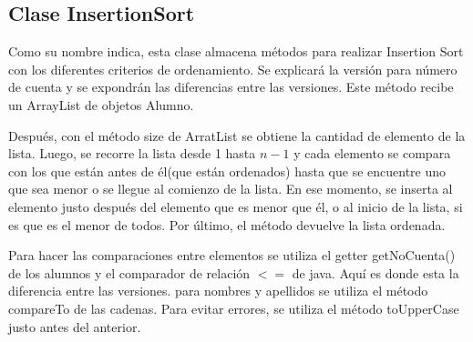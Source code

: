 \documentclass[11pt]{article}
\begin{document}
\subsection{Clase InsertionSort}
Como su nombre indica, esta clase almacena métodos para realizar Insertion Sort con los diferentes criterios de ordenamiento. Se explicará la versión para número de cuenta y se expondrán las diferencias entre las versiones. Este método recibe un ArrayList de objetos Alumno. 
\par
Después, con el método size de ArratList se obtiene la cantidad de elemento de la lista. Luego, se recorre la lista desde 1 hasta $n-1$ y cada elemento se compara con los que están antes de él(que están ordenados) hasta que se encuentre uno que sea menor o se llegue al comienzo de la lista. En ese momento, se inserta al elemento justo después del elemento que es menor que él, o al inicio de la lista, si es que es el menor de todos. Por último, el método devuelve la lista ordenada.
\par 
Para hacer las comparaciones entre elementos se utiliza el getter getNoCuenta() de los alumnos y el comparador de relación $<=$ de java. Aquí es donde esta la diferencia entre las versiones. para nombres y apellidos se utiliza el método compareTo de las cadenas. Para evitar errores, se utiliza el método toUpperCase justo antes del anterior.
\end{document}
